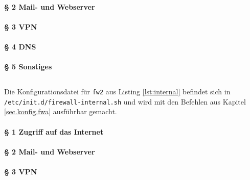 

\paragraph{§ 2 Mail- und Webserver}



\paragraph{§ 3 VPN}


\paragraph{§ 4 DNS}


\paragraph{§ 5 Sonstiges}



\subsection{\fwb}

Die Konfigurationsdatei für {\tt fw2} aus Listing \ref{lst:internal}
befindet sich in\\
{\tt /etc/init.d/firewall-internal.sh} und wird mit den Befehlen
aus Kapitel \ref{sec.konfig.fwa} ausführbar gemacht.

\paragraph{§ 1 Zugriff auf das Internet}



\paragraph{§ 2 Mail- und Webserver}


\paragraph{§ 3 VPN}

